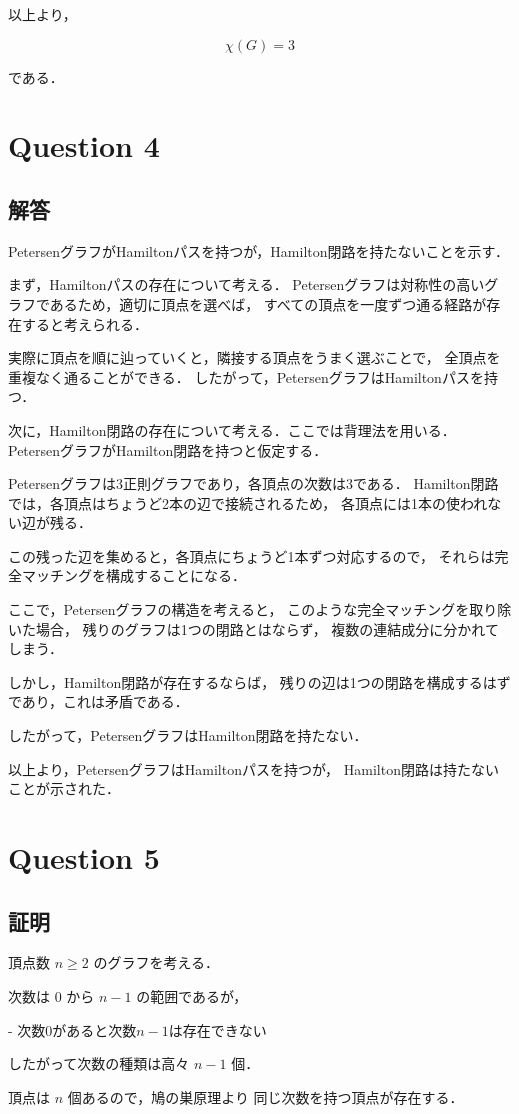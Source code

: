 \documentclass[uplatex,a4paper,11pt]{jsarticle}
\begin{document}
以上より，

\[
\chi(G) = 3
\]

である．


\section*{Question 4}
\subsection*{解答}

PetersenグラフがHamiltonパスを持つが，Hamilton閉路を持たないことを示す．

まず，Hamiltonパスの存在について考える．
Petersenグラフは対称性の高いグラフであるため，適切に頂点を選べば，
すべての頂点を一度ずつ通る経路が存在すると考えられる．

実際に頂点を順に辿っていくと，隣接する頂点をうまく選ぶことで，
全頂点を重複なく通ることができる．
したがって，PetersenグラフはHamiltonパスを持つ．

次に，Hamilton閉路の存在について考える．ここでは背理法を用いる．
PetersenグラフがHamilton閉路を持つと仮定する．

Petersenグラフは3正則グラフであり，各頂点の次数は3である．
Hamilton閉路では，各頂点はちょうど2本の辺で接続されるため，
各頂点には1本の使われない辺が残る．

この残った辺を集めると，各頂点にちょうど1本ずつ対応するので，
それらは完全マッチングを構成することになる．

ここで，Petersenグラフの構造を考えると，
このような完全マッチングを取り除いた場合，
残りのグラフは1つの閉路とはならず，
複数の連結成分に分かれてしまう．

しかし，Hamilton閉路が存在するならば，
残りの辺は1つの閉路を構成するはずであり，これは矛盾である．

したがって，PetersenグラフはHamilton閉路を持たない．

以上より，PetersenグラフはHamiltonパスを持つが，
Hamilton閉路は持たないことが示された．


\section*{Question 5}

\subsection*{証明}

頂点数 $n \ge 2$ のグラフを考える．

次数は $0$ から $n-1$ の範囲であるが，

- 次数0があると次数$n-1$は存在できない

したがって次数の種類は高々 $n-1$ 個．

頂点は $n$ 個あるので，鳩の巣原理より  
同じ次数を持つ頂点が存在する．
\end{document}
